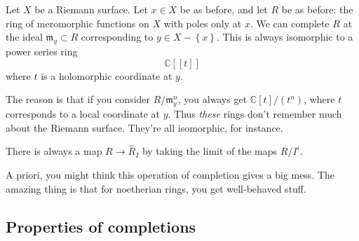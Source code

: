 \begin{example} 
Let $X$ be a Riemann surface. Let $ x \in X$ be as before, and let $R$ be as
before: the ring of meromorphic functions on $X$ with poles only at $x$. We can
complete $R$ at the ideal $\mathfrak{m}_y \subset R$ corresponding to $y \in X - \left\{x\right\}$. This
is always isomorphic to a power series ring
\[ \mathbb{C}[[t]]  \]
where $t$ is a holomorphic coordinate at $y$. 

The reason is that if you consider $R/\mathfrak{m}_y^n$, you always get
$\mathbb{C}[t]/(t^n)$, where $t$ corresponds to a local coordinate at $y$. Thus
\emph{these} rings don't remember much about the Riemann surface. They're all
isomorphic, for instance. 
\end{example} 

\begin{remark} 
There is always a map $R \to \hat{R}_I$ by taking the limit of the maps $R/I^i$.
\end{remark} 

A priori, you might think this operation of completion gives  a big mess. The amazing thing is that for
noetherian rings, you get well-behaved stuff.

\subsection{Properties of completions}

